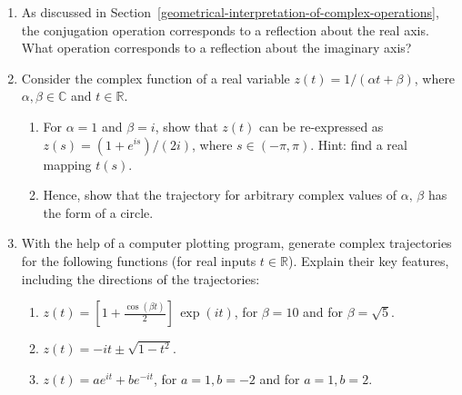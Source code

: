 \documentclass[10pt,a4paper]{article}
\begin{document}
\begin{enumerate}
\item
  As discussed in
  Section~\ref{geometrical-interpretation-of-complex-operations}, the
  conjugation operation corresponds to a reflection about the real
  axis.  What operation corresponds to a reflection about the
  imaginary axis?

\item
  Consider the complex function of a real variable $z(t) = 1/(\alpha t
  + \beta)$, where $\alpha, \beta \in \mathbb{C}$ and $t \in
  \mathbb{R}$.
  \begin{enumerate}
  \item
  For $\alpha = 1$ and $\beta = i$, show that $z(t)$ can be
  re-expressed as $z(s) = (1+e^{is})/(2i)$, where $s \in (-\pi,\pi)$.
  Hint: find a real mapping $t(s)$.

\item
  Hence, show that the trajectory for arbitrary complex values of
  $\alpha,\, \beta$ has the form of a circle.
  \end{enumerate}

\item
  With the help of a computer plotting program, generate complex
trajectories for the following functions (for real inputs
$t \in\mathbb{R}$). Explain their key features, including the
directions of the trajectories:
\begin{enumerate}
\item
$z(t) = \left[1+\frac{\cos(\beta t)}{2}\right] \, \exp(it)$, for
$\beta = 10$ and for $\beta = \sqrt{5}$.

\item $z(t) = -it \pm \sqrt{1 - t^2}$.

\item $z(t) = ae^{it} + be^{-it}$, for $a = 1, b = -2$ and for
$a = 1, b = 2$.
\end{enumerate}
\end{enumerate}
\end{document}
